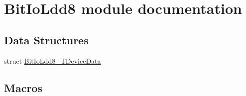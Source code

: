 \hypertarget{group___bit_io_ldd8__module}{\section{Bit\-Io\-Ldd8 module documentation}
\label{group___bit_io_ldd8__module}
}
\subsection*{Data Structures}
\begin{DoxyCompactItemize}
\item 
struct \hyperlink{struct_bit_io_ldd8___t_device_data}{Bit\-Io\-Ldd8\-\_\-\-T\-Device\-Data}
\end{DoxyCompactItemize}
\subsection*{Macros}
